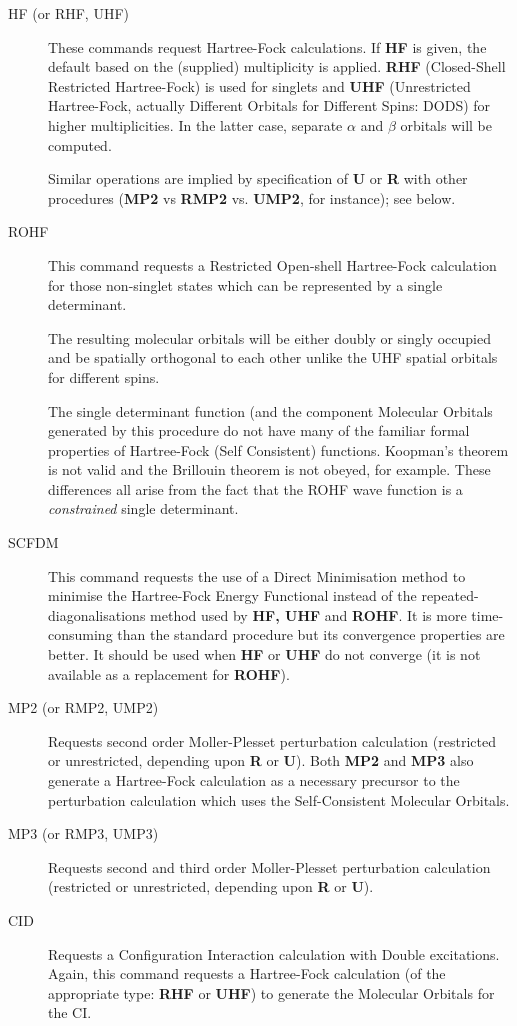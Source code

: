 \begin{description}
\item[HF   (or RHF, UHF)] These commands request Hartree-Fock calculations. 
If {\bf HF} is given, the default
based on the (supplied) multiplicity is applied. 
{\bf RHF} (Closed-Shell Restricted Hartree-Fock) is used for singlets and
{\bf UHF} (Unrestricted Hartree-Fock, actually Different Orbitals
for Different Spins: DODS)
for higher multiplicities. In the latter case, separate
$\alpha$ and $\beta$ orbitals will be computed.  

Similar
operations are implied by specification of {\bf U} or {\bf R} with other
procedures ({\bf MP2} vs {\bf RMP2} vs. {\bf UMP2}, for instance); see below.
\item[ROHF]   This command requests a Restricted Open-shell 
Hartree-Fock calculation
for those non-singlet states which can be represented by a single
determinant.  

The resulting molecular orbitals will be either
doubly or singly occupied and be spatially orthogonal to each other unlike
the UHF spatial orbitals for different spins.

The single determinant function (and the component Molecular Orbitals
generated by this procedure do not have many of the familiar
formal properties of Hartree-Fock (Self Consistent) functions. Koopman's
theorem is not valid and the Brillouin theorem is not obeyed, for example.
These differences all arise from the fact that the ROHF wave function
is a {\em constrained} single determinant.
\item[SCFDM] This command requests the use of a Direct Minimisation
method to minimise the Hartree-Fock Energy Functional instead of
the repeated-diagonalisations method used by {\bf HF, UHF} and 
{\bf ROHF}. It is more time-consuming than the standard procedure
but its convergence properties are better. It should be used
when {\bf HF} or {\bf UHF} do not converge (it is not available
as a replacement for {\bf ROHF}).
\item[MP2 (or RMP2, UMP2)]  Requests second order 
Moller-Plesset perturbation calculation (restricted or
unrestricted, depending upon {\bf R} or {\bf U}). Both {\bf MP2} and
{\bf MP3} also generate a Hartree-Fock calculation as a necessary
precursor to the perturbation calculation which uses the Self-Consistent
Molecular Orbitals.
\item[MP3 (or RMP3, UMP3)]  Requests second and third order 
Moller-Plesset perturbation calculation (restricted or
unrestricted, depending upon {\bf R} or {\bf U}).
\item[CID]    Requests a Configuration Interaction calculation with
Double excitations. Again, this command requests a Hartree-Fock
calculation (of the appropriate type: {\bf RHF} or {\bf UHF})
to generate the Molecular Orbitals for the CI.
\end{description}
